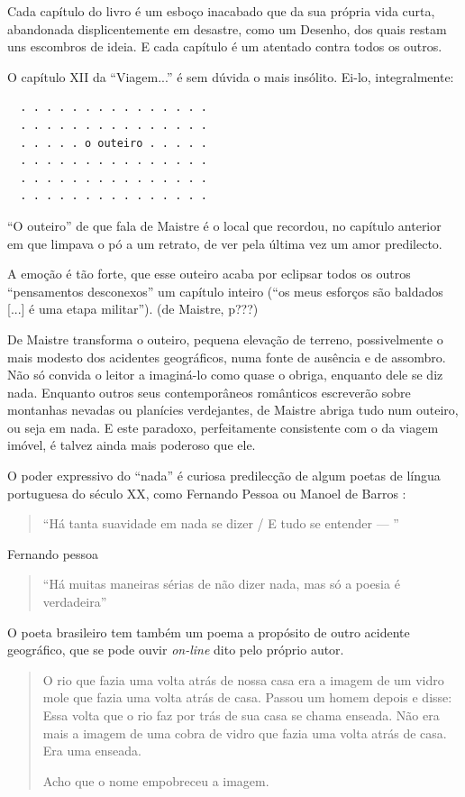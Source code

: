 \documentclass[12pt]{article}
\begin{document}
Cada capítulo do livro é um esboço inacabado que da sua própria vida
curta, abandonada displicentemente em desastre, como um Desenho, dos
quais restam uns escombros de ideia. E cada capítulo é um atentado
contra todos os outros.

O capítulo XII da ``Viagem...'' é sem dúvida o mais insólito. Ei-lo,
integralmente:

\begin{verbatim}
  . . . . . . . . . . . . . . .
  . . . . . . . . . . . . . . .
  . . . . . o outeiro . . . . .
  . . . . . . . . . . . . . . .
  . . . . . . . . . . . . . . .
  . . . . . . . . . . . . . . .
\end{verbatim}

``O outeiro'' de que fala de Maistre é o local que recordou, no
capítulo anterior em que limpava o pó a um retrato, de ver pela última
vez um amor predilecto.

A emoção é tão forte, que esse outeiro acaba por eclipsar todos os
outros ``pensamentos desconexos'' um capítulo inteiro (``os meus
esforços são baldados [...] é uma etapa militar''). (de Maistre, p???)

De Maistre transforma o outeiro, pequena elevação de terreno,
possivelmente o mais modesto dos acidentes geográficos, numa fonte de
ausência e de assombro. Não só convida o leitor a imaginá-lo como
quase o obriga, enquanto dele se diz nada. Enquanto outros seus
contemporâneos românticos escreverão sobre montanhas nevadas ou
planícies verdejantes, de Maistre abriga tudo num outeiro, ou seja em
nada. E este paradoxo, perfeitamente consistente com o da viagem
imóvel, é talvez ainda mais poderoso que ele.

O poder expressivo do ``nada'' é curiosa predilecção de algum poetas
de língua portuguesa do século XX, como Fernando Pessoa ou Manoel de
Barros \cite{manoel}:

\begin{quote}
  ``Há tanta suavidade em nada se dizer / E tudo se entender — ''
\end{quote}
Fernando pessoa

\begin{quote}
``Há muitas maneiras sérias de não dizer nada, mas só a poesia é verdadeira''
\end{quote}

O poeta brasileiro tem também um poema a propósito de outro acidente
geográfico, que se pode ouvir \emph{on-line} dito pelo próprio autor.

\begin{quote}
  O rio que fazia uma volta atrás de nossa casa
era a imagem de um vidro mole que fazia uma
volta atrás de casa.
Passou um homem depois e disse: Essa volta
que o rio faz por trás de sua casa se chama
enseada.
Não era mais a imagem de uma cobra de vidro
que fazia uma volta atrás de casa.
Era uma enseada.

Acho que o nome empobreceu a imagem. 
\end{quote}
\end{document}
